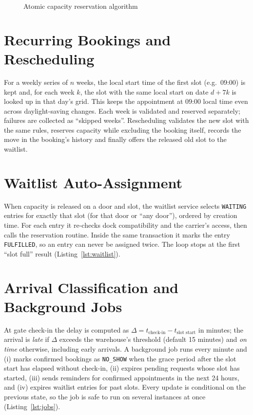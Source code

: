 \begin{figure}[H]
\centering

\caption{Atomic capacity reservation algorithm}
\label{fig:reserve}
\end{figure}

\section{Recurring Bookings and Rescheduling}
For a weekly series of $n$ weeks, the local start time of the first slot (e.g.\ 09:00) is kept and, for each week $k$, the slot with the same local start on date $d+7k$ is looked up in that day's grid. This keeps the appointment at 09:00 local time even across daylight-saving changes. Each week is validated and reserved separately; failures are collected as ``skipped weeks''. Rescheduling validates the new slot with the same rules, reserves capacity while excluding the booking itself, records the move in the booking's history and finally offers the released old slot to the waitlist.

\section{Waitlist Auto-Assignment}
When capacity is released on a door and slot, the waitlist service selects \texttt{WAITING} entries for exactly that slot (for that door or ``any door''), ordered by creation time. For each entry it re-checks dock compatibility and the carrier's access, then calls the reservation routine. Inside the same transaction it marks the entry \texttt{FULFILLED}, so an entry can never be assigned twice. The loop stops at the first ``slot full'' result (Listing~\ref{lst:waitlist}).

\section{Arrival Classification and Background Jobs}
At gate check-in the delay is computed as $\Delta = t_\text{check-in} - t_\text{slot start}$ in minutes; the arrival is \emph{late} if $\Delta$ exceeds the warehouse's threshold (default 15 minutes) and \emph{on time} otherwise, including early arrivals. A background job runs every minute and (i) marks confirmed bookings as \texttt{NO\_SHOW} when the grace period after the slot start has elapsed without check-in, (ii) expires pending requests whose slot has started, (iii) sends reminders for confirmed appointments in the next 24 hours, and (iv) expires waitlist entries for past slots. Every update is conditional on the previous state, so the job is safe to run on several instances at once (Listing~\ref{lst:jobs}).

